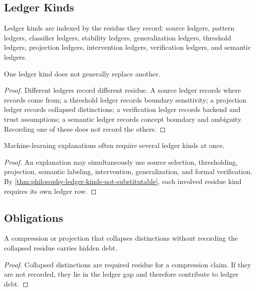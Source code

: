 \subsection{Ledger Kinds}
\label{subsec:philosophy-ledger-kinds}

\begin{definition}
\label{def:philosophy-ledger-kind}
Ledger kinds are indexed by the residue they record: source ledgers,
pattern ledgers, classifier ledgers, stability ledgers, generalization
ledgers, threshold ledgers, projection ledgers, intervention ledgers,
verification ledgers, and semantic ledgers.
\end{definition}

\begin{theorem}
\label{thm:philosophy-ledger-kinds-not-substitutable}
One ledger kind does not generally replace another.
\end{theorem}
\begin{proof}
Different ledgers record different residue. A source ledger records
where records come from; a threshold ledger records boundary sensitivity;
a projection ledger records collapsed distinctions; a verification ledger
records backend and trust assumptions; a semantic ledger records concept
boundary and ambiguity. Recording one of these does not record the
others.
\end{proof}

\begin{corollary}
\label{cor:philosophy-complete-explanations-need-multiple-ledgers}
Machine-learning explanations often require several ledger kinds at once.
\end{corollary}
\begin{proof}
An explanation may simultaneously use source selection, thresholding,
projection, semantic labeling, intervention, generalization, and formal
verification. By
\autoref{thm:philosophy-ledger-kinds-not-substitutable}, each involved
residue kind requires its own ledger row.
\end{proof}

\subsection{Obligations}
\label{subsec:philosophy-ledger-obligations}

\begin{theorem}
\label{thm:philosophy-compression-without-ledger-hides-debt}
A compression or projection that collapses distinctions without recording
the collapsed residue carries hidden debt.
\end{theorem}
\begin{proof}
Collapsed distinctions are required residue for a compression claim. If
they are not recorded, they lie in the ledger gap and therefore
contribute to ledger debt.
\end{proof}


